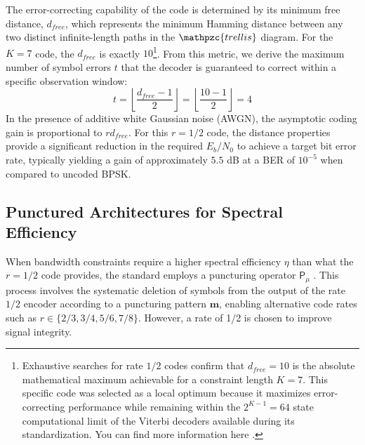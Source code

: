The error-correcting capability of the code is determined by its minimum free distance, $d_{free}$, which represents the minimum Hamming distance between any two distinct infinite-length paths in the $\mathpzc{trellis}$ diagram. For the $K=7$ code, the $d_{free}$ is exactly $10$\footnote{Exhaustive searches for rate $1/2$ codes confirm that $d_{free}=10$ is the absolute mathematical maximum achievable for a constraint length $K=7$. This specific code was selected as a local optimum because it maximizes error-correcting performance while remaining within the $2^{K-1}=64$ state computational limit of the Viterbi decoders available during its standardization. You can find more information here \autocite[Section 4.2]{CCSDS_130_1_G_3}.}. From this metric, we derive the maximum number of symbol errors $t$ that the decoder is guaranteed to correct within a specific observation window:
\begin{equation}
    t = \left\lfloor \frac{d_{free} - 1}{2} \right\rfloor = \left\lfloor \frac{10 - 1}{2} \right\rfloor = 4
\end{equation}
In the presence of additive white Gaussian noise (AWGN), the asymptotic coding gain is proportional to $r  d_{free}$. For this $r=1/2$ code, the distance properties provide a significant reduction in the required $E_{b}/N_{0}$ to achieve a target bit error rate, typically yielding a gain of approximately $5.5$ dB at a BER of $10^{-5}$ when compared to uncoded BPSK.

\subsection{Punctured Architectures for Spectral Efficiency}

When bandwidth constraints require a higher spectral efficiency $\eta$ than what the $r=1/2$ code provides, the standard employs a puncturing operator $\mathsf{P}_{\mu}$ \autocite[Section 4.3]{CCSDS_130_1_G_3}. This process involves the systematic deletion of symbols from the output of the rate $1/2$ encoder according to a puncturing pattern $\bm{m}$, enabling alternative code rates such as $r \in \{2/3, 3/4, 5/6, 7/8\}$. However, a rate of 1/2 is chosen to improve signal integrity. 

